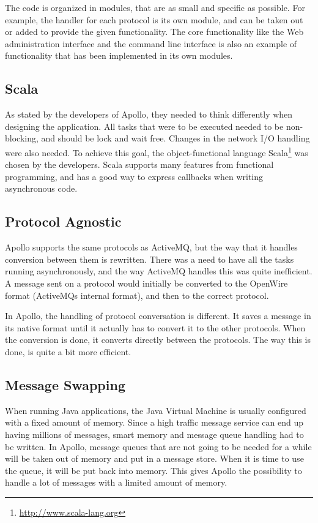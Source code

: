 The code is organized in modules, that are as small and specific as possible. For example, the handler for each protocol is its own module, and can be taken out or added to provide the given functionality. The core functionality like the Web administration interface and the command line interface is also an example of functionality that has been implemented in its own modules.

\subsection{Scala}
As stated by the developers of Apollo, they needed to think differently when designing the application. All tasks that were to be executed needed to be non-blocking, and should be lock and wait free. Changes in the network I/O handling were also needed. To achieve this goal, the object-functional language Scala\footnote{\url{http://www.scala-lang.org}} was chosen by the developers. Scala supports many features from functional programming, and has a good way to express callbacks when writing asynchronous code.

\subsection{Protocol Agnostic}
Apollo supports the same protocols as ActiveMQ, but the way that it handles conversion between them is rewritten. There was a need to have all the tasks running asynchronously, and the way ActiveMQ handles this was quite inefficient. A message sent on a protocol would initially be converted to the OpenWire format (ActiveMQs internal format), and then to the correct protocol.

In Apollo, the handling of protocol conversation is different. It saves a message in its native format until it actually has to convert it to the other protocols. When the conversion is done, it converts directly between the protocols. The way this is done, is quite a bit more efficient.

\subsection{Message Swapping}
When running Java applications, the Java Virtual Machine is usually configured with a fixed amount of memory. Since a high traffic message service can end up having millions of messages, smart memory and message queue handling had to be written. In Apollo, message queues that are not going to be needed for a while will be taken out of memory and put in a message store. When it is time to use the queue, it will be put back into memory. This gives Apollo the possibility to handle a lot of messages with a limited amount of memory.

